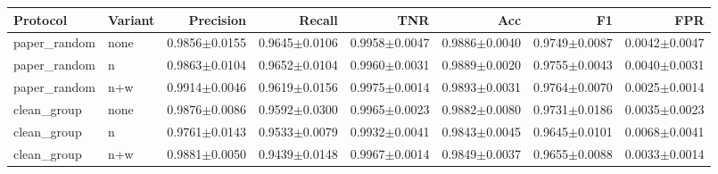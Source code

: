 \begin{tabular}{@{}llrrrrrr@{}}
\toprule
Protocol & Variant & Precision & Recall & TNR & Acc & F1 & FPR \\ \midrule
paper\_random & none & 0.9856$\pm$0.0155 & 0.9645$\pm$0.0106 & 0.9958$\pm$0.0047 & 0.9886$\pm$0.0040 & 0.9749$\pm$0.0087 & 0.0042$\pm$0.0047 \\
paper\_random & n & 0.9863$\pm$0.0104 & 0.9652$\pm$0.0104 & 0.9960$\pm$0.0031 & 0.9889$\pm$0.0020 & 0.9755$\pm$0.0043 & 0.0040$\pm$0.0031 \\
paper\_random & n+w & 0.9914$\pm$0.0046 & 0.9619$\pm$0.0156 & 0.9975$\pm$0.0014 & 0.9893$\pm$0.0031 & 0.9764$\pm$0.0070 & 0.0025$\pm$0.0014 \\
clean\_group & none & 0.9876$\pm$0.0086 & 0.9592$\pm$0.0300 & 0.9965$\pm$0.0023 & 0.9882$\pm$0.0080 & 0.9731$\pm$0.0186 & 0.0035$\pm$0.0023 \\
clean\_group & n & 0.9761$\pm$0.0143 & 0.9533$\pm$0.0079 & 0.9932$\pm$0.0041 & 0.9843$\pm$0.0045 & 0.9645$\pm$0.0101 & 0.0068$\pm$0.0041 \\
clean\_group & n+w & 0.9881$\pm$0.0050 & 0.9439$\pm$0.0148 & 0.9967$\pm$0.0014 & 0.9849$\pm$0.0037 & 0.9655$\pm$0.0088 & 0.0033$\pm$0.0014 \\
\bottomrule
\end{tabular}
